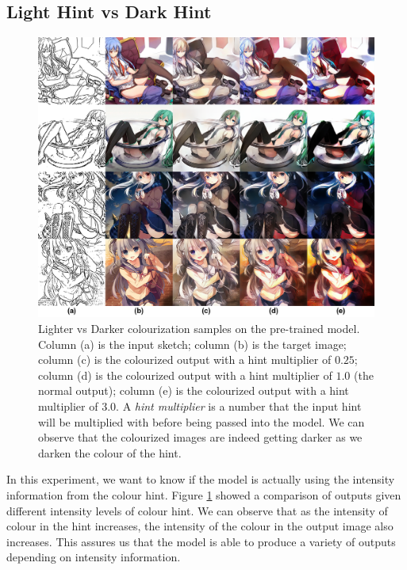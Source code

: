 \subsection{Light Hint vs Dark Hint}
\begin{figure}
    \centering
    \includegraphics[width=1.0\textwidth]{images/colorization/lighter_vs_darker.png}
    \caption{Lighter vs Darker colourization samples on the pre-trained model. Column (a) is the input sketch; column (b) is the target image; column (c) is the colourized output with a hint multiplier of $0.25$; column (d) is the colourized output with a hint multiplier of $1.0$ (the normal output); column (e) is the colourized output with a hint multiplier of $3.0$. A \textit{hint multiplier} is a number that the input hint will be multiplied with before being passed into the model. We can observe that the colourized images are indeed getting darker as we darken the colour of the hint.}
    \label{fig:lighter_vs_darker}
\end{figure}
In this experiment, we want to know if the model is actually using the intensity information from the colour hint. Figure \ref{fig:lighter_vs_darker} showed a comparison of outputs given different intensity levels of colour hint. We can observe that as the intensity of colour in the hint increases, the intensity of the colour in the output image also increases. This assures us that the model is able to produce a variety of outputs depending on intensity information.

